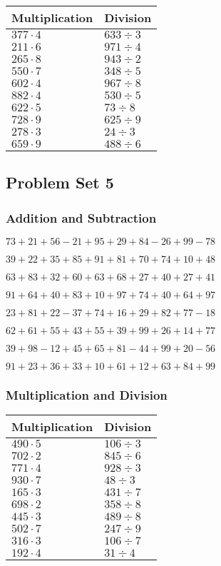 \begin{longtable}[]{@{}ll@{}}
\toprule
Multiplication & Division\tabularnewline
\midrule
\endhead
\(377\cdot4\) & \(633÷3\)\tabularnewline
\(211\cdot6\) & \(971÷4\)\tabularnewline
\(265\cdot8\) & \(943÷2\)\tabularnewline
\(550\cdot7\) & \(348÷5\)\tabularnewline
\(602\cdot4\) & \(967÷8\)\tabularnewline
\(882\cdot4\) & \(530÷5\)\tabularnewline
\(622\cdot5\) & \(73÷8\)\tabularnewline
\(728\cdot9\) & \(625÷9\)\tabularnewline
\(278\cdot3\) & \(24÷3\)\tabularnewline
\(659\cdot9\) & \(488÷6\)\tabularnewline
\bottomrule
\end{longtable}

\hypertarget{problem-set-5}{%
\subsection{Problem Set 5}\label{problem-set-5}}

\hypertarget{addition-and-subtraction-4}{%
\subsubsection{Addition and
Subtraction}\label{addition-and-subtraction-4}}

\(73+21+56-21+95+29+84-26+99-78\)

\(39+22+35+85+91+81+70+74+10+48\)

\(63+83+32+60+63+68+27+40+27+41\)

\(91+64+40+83+10+97+74+40+64+97\)

\(23+81+22-37+74+16+29+82+77-18\)

\(62+61+55+43+55+39+99+26+14+77\)

\(39+98-12+45+65+81-44+99+20-56\)

\(91+23+36+33+10+61+12+63+84+99\)

\hypertarget{multiplication-and-division-4}{%
\subsubsection{Multiplication and
Division}\label{multiplication-and-division-4}}

\begin{longtable}[]{@{}ll@{}}
\toprule
Multiplication & Division\tabularnewline
\midrule
\endhead
\(490\cdot5\) & \(106÷3\)\tabularnewline
\(702\cdot2\) & \(845÷6\)\tabularnewline
\(771\cdot4\) & \(928÷3\)\tabularnewline
\(930\cdot7\) & \(48÷3\)\tabularnewline
\(165\cdot3\) & \(431÷7\)\tabularnewline
\(698\cdot2\) & \(358÷8\)\tabularnewline
\(445\cdot3\) & \(489÷8\)\tabularnewline
\(502\cdot7\) & \(247÷9\)\tabularnewline
\(316\cdot3\) & \(106÷7\)\tabularnewline
\(192\cdot4\) & \(31 ÷4\)\tabularnewline
\bottomrule
\end{longtable}

